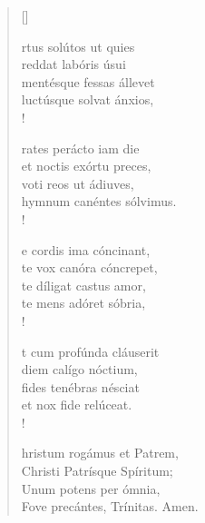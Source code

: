 \begin{verse}[\versewidth]
 


 
rtus solútos ut quies\\
reddat labóris úsui\\
mentésque fessas állevet\\
luctúsque solvat ánxios,\\!

rates perácto iam die\\
et noctis exórtu preces,\\ 
voti reos ut ádiuves,\\ 
hymnum canéntes sólvimus.\\!

e cordis ima cóncinant, \\
te vox canóra cóncrepet, \\
te díligat castus amor, \\
te mens adóret sóbria, \\!

t cum profúnda cláuserit\\
diem calígo nóctium,\\ 
fides tenébras nésciat\\
et nox fide relúceat.\\!

hristum rogámus et Patrem,\\ 
Christi Patrísque Spíritum;\\
Unum potens per ómnia,\\ 
Fove precántes, Trínitas. Amen.
\end{verse}




\def\greinitialformat#1{{\fontsize{40}{40}\selectfont #1}}
\gresetfirstlineaboveinitial{\small \textcolor{red}{æstate}}{}
\setaboveinitialseparation{0.72mm}


